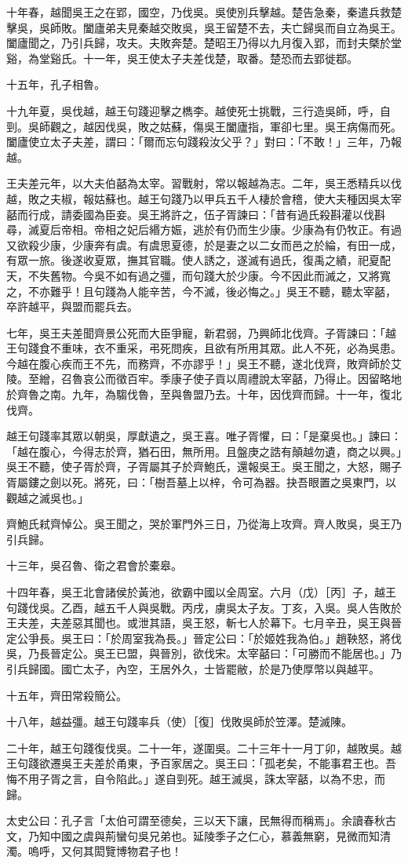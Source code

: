 \begin{pinyinscope}
十年春，越聞吳王之在郢，國空，乃伐吳。吳使別兵擊越。楚告急秦，秦遣兵救楚擊吳，吳師敗。闔廬弟夫見秦越交敗吳，吳王留楚不去，夫亡歸吳而自立為吳王。闔廬聞之，乃引兵歸，攻夫。夫敗奔楚。楚昭王乃得以九月復入郢，而封夫槩於堂谿，為堂谿氏。十一年，吳王使太子夫差伐楚，取番。楚恐而去郢徙鄀。

十五年，孔子相魯。

十九年夏，吳伐越，越王句踐迎擊之檇李。越使死士挑戰，三行造吳師，呼，自剄。吳師觀之，越因伐吳，敗之姑蘇，傷吳王闔廬指，軍卻七里。吳王病傷而死。闔廬使立太子夫差，謂曰：「爾而忘句踐殺汝父乎？」對曰：「不敢！」三年，乃報越。

王夫差元年，以大夫伯嚭為太宰。習戰射，常以報越為志。二年，吳王悉精兵以伐越，敗之夫椒，報姑蘇也。越王句踐乃以甲兵五千人棲於會稽，使大夫種因吳太宰嚭而行成，請委國為臣妾。吳王將許之，伍子胥諫曰：「昔有過氏殺斟灌以伐斟尋，滅夏后帝相。帝相之妃后緡方娠，逃於有仍而生少康。少康為有仍牧正。有過又欲殺少康，少康奔有虞。有虞思夏德，於是妻之以二女而邑之於綸，有田一成，有眾一旅。後遂收夏眾，撫其官職。使人誘之，遂滅有過氏，復禹之績，祀夏配天，不失舊物。今吳不如有過之彊，而句踐大於少康。今不因此而滅之，又將寬之，不亦難乎！且句踐為人能辛苦，今不滅，後必悔之。」吳王不聽，聽太宰嚭，卒許越平，與盟而罷兵去。

七年，吳王夫差聞齊景公死而大臣爭寵，新君弱，乃興師北伐齊。子胥諫曰：「越王句踐食不重味，衣不重采，弔死問疾，且欲有所用其眾。此人不死，必為吳患。今越在腹心疾而王不先，而務齊，不亦謬乎！」吳王不聽，遂北伐齊，敗齊師於艾陵。至繒，召魯哀公而徵百牢。季康子使子貢以周禮說太宰嚭，乃得止。因留略地於齊魯之南。九年，為騶伐魯，至與魯盟乃去。十年，因伐齊而歸。十一年，復北伐齊。

越王句踐率其眾以朝吳，厚獻遺之，吳王喜。唯子胥懼，曰：「是棄吳也。」諫曰：「越在腹心，今得志於齊，猶石田，無所用。且盤庚之誥有顛越勿遺，商之以興。」吳王不聽，使子胥於齊，子胥屬其子於齊鮑氏，還報吳王。吳王聞之，大怒，賜子胥屬鏤之劍以死。將死，曰：「樹吾墓上以梓，令可為器。抉吾眼置之吳東門，以觀越之滅吳也。」

齊鮑氏弒齊悼公。吳王聞之，哭於軍門外三日，乃從海上攻齊。齊人敗吳，吳王乃引兵歸。

十三年，吳召魯、衛之君會於橐皋。

十四年春，吳王北會諸侯於黃池，欲霸中國以全周室。六月（戊）［丙］子，越王句踐伐吳。乙酉，越五千人與吳戰。丙戌，虜吳太子友。丁亥，入吳。吳人告敗於王夫差，夫差惡其聞也。或泄其語，吳王怒，斬七人於幕下。七月辛丑，吳王與晉定公爭長。吳王曰：「於周室我為長。」晉定公曰：「於姬姓我為伯。」趙鞅怒，將伐吳，乃長晉定公。吳王已盟，與晉別，欲伐宋。太宰嚭曰：「可勝而不能居也。」乃引兵歸國。國亡太子，內空，王居外久，士皆罷敝，於是乃使厚幣以與越平。

十五年，齊田常殺簡公。

十八年，越益彊。越王句踐率兵（使）［復］伐敗吳師於笠澤。楚滅陳。

二十年，越王句踐復伐吳。二十一年，遂圍吳。二十三年十一月丁卯，越敗吳。越王句踐欲遷吳王夫差於甬東，予百家居之。吳王曰：「孤老矣，不能事君王也。吾悔不用子胥之言，自令陷此。」遂自剄死。越王滅吳，誅太宰嚭，以為不忠，而歸。

太史公曰：孔子言「太伯可謂至德矣，三以天下讓，民無得而稱焉」。余讀春秋古文，乃知中國之虞與荊蠻句吳兄弟也。延陵季子之仁心，慕義無窮，見微而知清濁。嗚呼，又何其閎覽博物君子也！


\end{pinyinscope}